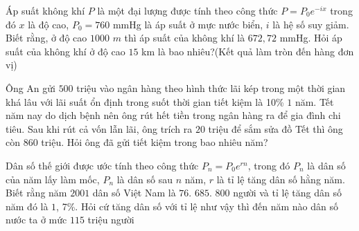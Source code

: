 \begin{ex}%
	Áp suất không khí $P$ là một đại lượng được tính theo công thức $P=P_0 e^{-ix}$ trong đó $x$ là độ  cao, $P_0=760$ mmHg là áp suất ở mực nước biển, $i$ là hệ số suy giảm. Biết rằng, ở độ cao $1000$ $m$ thì áp suất của không khí là $672{,}72$ mmHg. Hỏi áp suất của không khí ở độ cao $15$ km là bao nhiêu?(Kết quả làm tròn đến hàng đơn vị)
\end{ex}

\begin{ex}%
	Ông An gửi $500$ triệu vào ngân hàng theo hình thức lãi kép trong một thời gian khá lâu với lãi suất ổn định trong suốt thời gian tiết kiệm là 10\% $1$  năm. Tết năm nay do dịch bệnh nên ông rút hết tiền trong ngân hàng ra để gia đình chi tiêu. Sau khi rút cả vốn lẫn lãi, ông trích ra $20$ triệu để sắm sửa đồ Tết thì ông còn $860$ triệu. Hỏi ông đã gửi tiết kiệm trong bao nhiêu năm?
\end{ex}

\begin{ex}%
	Dân số thế giới  được ước tính theo công thức $P_n=P_0 e^{rn}$, trong đó $P_n$ là dân số của năm lấy làm mốc, $P_n$ là dân số sau $n$ năm, $r$ là tỉ lệ tăng dân số hằng năm. Biết rằng năm $2001$ dân số Việt Nam là $76$. $685$. $800$ người và tỉ lệ tăng dân số năm đó là $1$, 7\%. Hỏi cứ tăng dân số với tỉ lệ như vậy thì đến năm nào dân số nước ta ở mức $115$ triệu người
\end{ex}

